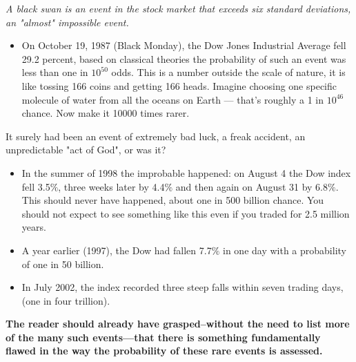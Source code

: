 \textit{A black swan is an event in the stock market that exceeds six standard deviations, an "almost" impossible event. }
\begin{itemize}
    \item On October 19, 1987 (Black Monday), the Dow Jones Industrial Average fell 29.2 percent, based on classical theories the probability of such an event was less than one in $10^{50}$ odds. This is a number outside the scale of nature, it is like tossing 166 coins and getting 166 heads. Imagine choosing one specific molecule of water from all the oceans on Earth — that’s roughly a 1 in $10^{46}$ chance. Now make it 10000 times rarer.
\end{itemize}
It surely had been an event of extremely bad luck, a freak accident, an unpredictable "act of God", or was it?
\begin{itemize}

\item In the summer of 1998 the improbable happened: on August 4 the Dow index fell 3.5$\%$, three weeks later by 4.4$\%$ and then again on August 31 by 6.8$\%$. This should never have happened, about one in 500 billion chance. You should not expect to see something like this even if you traded for 2.5 million years.
\item A year earlier (1997), the Dow had fallen 7.7$\%$ in one day with a probability of one in 50 billion.
\item In July 2002, the index recorded three steep falls within seven trading days, (one in four trillion).
\end{itemize}
\textbf{The reader should already have grasped--without the need to list more of the many such events—that there is something fundamentally flawed in the way the probability of these rare events is assessed.}